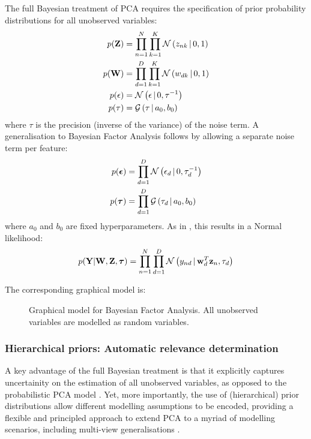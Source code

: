 The full Bayesian treatment of PCA requires the specification of prior probability distributions for all unobserved variables:
\begin{align*}
	p({\bf Z}) &= \prod_{n=1}^{N} \prod_{k=1}^{K} \mathcal{N}\left(z_{nk} \,|\, 0,1\right) \\
	p({\bf W}) &= \prod_{d=1}^{D} \prod_{k=1}^{K} \mathcal{N}\left(w_{dk} \,|\, 0,1\right) \\
	p(\epsilon) &= \mathcal{N}\left(\epsilon \,|\, 0,\tau^{-1}\right) \\
	p(\tau) &= \mathcal{G}\left(\tau \,|\, a_0,b_0\right)
\end{align*}
where $\tau$ is the precision (inverse of the variance) of the noise term. A generalisation to Bayesian Factor Analysis follows by allowing a separate noise term per feature:
\begin{align*}
	p(\mbox{\boldmath $\epsilon$}) &= \prod_{d=1}^{D} \mathcal{N}\left(\epsilon_d \,|\, 0,\tau_d^{-1}\right) \\
	p(\mbox{\boldmath $\tau$}) &= \prod_{d=1}^{D} \mathcal{G}\left(\tau_d \,|\, a_0,b_0\right)
\end{align*}
where $a_0$ and $b_0$ are fixed hyperparameters. As in , this results in a Normal likelihood:
\[
	p({\bf Y}|{\bf W},{\bf Z},\mbox{\boldmath $\tau$}) = \prod_{n=1}^{N} \prod_{d=1}^{D} \mathcal{N}\left(y_{nd} \,|\, {\bf w}_{d}^T {\bf z}_{n},\tau_d\right)
\]

The corresponding graphical model is:

\begin{figure}[H] 
	\centering
	
	\caption{Graphical model for Bayesian Factor Analysis. All unobserved variables are modelled as random variables.}
	\label{fig:bayesianFA}
\end{figure}

\subsubsection{Hierarchical priors: Automatic relevance determination}
A key advantage of the full Bayesian treatment is that it explicitly captures uncertainity on the estimation of all unobserved variables, as opposed to the probabilistic PCA model \cite{Bishop1999a,Bishop1999b}. Yet, more importantly, the use of (hierarchical) prior distributions allow different modelling assumptions to be encoded, providing a flexible and principled approach to extend PCA to a myriad of modelling scenarios, including multi-view generalisations \cite{Klami2008,Virtanen2012,Klami2015,Bunte2016,Khan2014,Zhao2016}.

